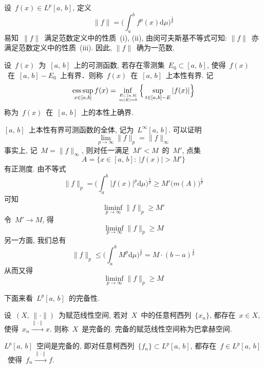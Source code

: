 \medskip

\qquad 设~$f(x)\in L^p[a,\,b]$, 定义
\[
\|f\|=\Big(\int_{a}^{b}f^{p}(x)\mathrm{d}\mu \Big)^{\frac{1}{p}}
\]
易知~$\|f\|$~满足范数定义中的性质~(i), (ii), 由闵可夫斯基不等式可知: $\|f\|$~亦满足范数定义中的性质~(iii). 因此, $\|f\|$~确为一范数.

\begin{Remark}
设~$f(x)$~为~$[a,\,b]$~上的可测函数, 若存在零测集~$E_0 \subset [a,\,b]$, 使得~$f(x)$~在~$[a,\,b]-E_0$~上有界．则称~$f(x)$~在~$[a,\,b]$~上本性有界. 记
\[
\mathop{\mathrm{ess}\sup}_{x \in [a,b]} f(x) =\inf_{E \subset [a,b] \atop m(E)=0} \Big\{ \sup_{t \in [a,b]-E} | f(x)| \Big\}
\]
称为~$f(x)$~在~$[a,\,b]$~上的本性上确界.

$[a,\,b]$~上本性有界可测函数的全体, 记为~$L^\infty[a,\,b]$. 可以证明
\[
\lim_{p \to \infty} \|f\|_p = \|f\|_\infty
\]
事实上, 记~$M = \|f\|_\infty$, 则对任一满足~$M' < M$~的~$M'$, 点集
\[
A = \big\{ x \in [a,\,b]:\: |f(x)| > M'\big\}
\]
有正测度. 由不等式
\[
\|f\|_p = \Big( \int_a^b \big| f(x)\big|^p \mathrm{d} \mu \Big)^\frac{1}{p} \geqslant M' \big( m(A) \big)^\frac{1}{p}
\]
可知
\[
\liminf_{p \to \infty} \|f\|_p \geqslant M'
\]
令~$M' \to M$, 得
\[
\liminf_{p \to \infty} \|f\|_p \geqslant M
\]
另一方面, 我们总有
\[
\|f\|_p \leqslant \Big( \int_a^b M^p \mathrm{d} \mu \Big)^\frac{1}{p} = M \cdot (b-a)^\frac{1}{p}
\]
从而又得
\[
\liminf_{p \to \infty} \|f\|_p \geqslant M
\]
\end{Remark}

下面来看~$L^p[a,\,b]$~的完备性.

\begin{Definition}
设~$(X,\,\|\cdot\|)$~为赋范线性空间, 若对~$X$~中的任意柯西列~$\{x_n\}$, 都存在~$x \in X$, 使得~$x_n \xrightarrow {\|\cdot\|} x$. 则称~$X$~是完备的. 完备的赋范线性空间称为巴拿赫空间.
\end{Definition}

\begin{Theorem}
$L^p[a,\,b]$~空间是完备的, 即对任意柯西列~$\{f_n\} \subset L^p[a,\,b]$, 都存在~$f \in L^p[a,\,b]$~使得~$f_n \xrightarrow {\|\cdot\|} f$.
\end{Theorem}

